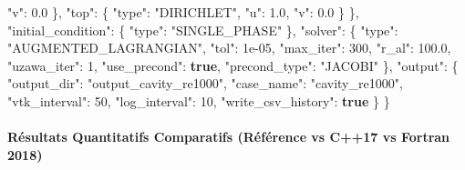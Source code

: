 \documentclass[
  10pt,
]{article}
\newenvironment{Shaded}{}{}
\newcommand{\DataTypeTok}[1]{\textcolor[rgb]{0.56,0.13,0.00}{#1}}
\newcommand{\DecValTok}[1]{\textcolor[rgb]{0.25,0.63,0.44}{#1}}
\newcommand{\FloatTok}[1]{\textcolor[rgb]{0.25,0.63,0.44}{#1}}
\newcommand{\FunctionTok}[1]{\textcolor[rgb]{0.02,0.16,0.49}{#1}}
\newcommand{\KeywordTok}[1]{\textcolor[rgb]{0.00,0.44,0.13}{\textbf{#1}}}
\newcommand{\StringTok}[1]{\textcolor[rgb]{0.25,0.44,0.63}{#1}}
\begin{document}
\begin{Shaded}
\begin{Highlighting}[]
      \DataTypeTok{"v"}\FunctionTok{:} \FloatTok{0.0}
    \FunctionTok{\},}
    \DataTypeTok{"top"}\FunctionTok{:} \FunctionTok{\{}
      \DataTypeTok{"type"}\FunctionTok{:} \StringTok{"DIRICHLET"}\FunctionTok{,}
      \DataTypeTok{"u"}\FunctionTok{:} \FloatTok{1.0}\FunctionTok{,}
      \DataTypeTok{"v"}\FunctionTok{:} \FloatTok{0.0}
    \FunctionTok{\}}
  \FunctionTok{\},}
  \DataTypeTok{"initial\_condition"}\FunctionTok{:} \FunctionTok{\{}
    \DataTypeTok{"type"}\FunctionTok{:} \StringTok{"SINGLE\_PHASE"}
  \FunctionTok{\},}
  \DataTypeTok{"solver"}\FunctionTok{:} \FunctionTok{\{}
    \DataTypeTok{"type"}\FunctionTok{:} \StringTok{"AUGMENTED\_LAGRANGIAN"}\FunctionTok{,}
    \DataTypeTok{"tol"}\FunctionTok{:} \DecValTok{1e{-}05}\FunctionTok{,}
    \DataTypeTok{"max\_iter"}\FunctionTok{:} \DecValTok{300}\FunctionTok{,}
    \DataTypeTok{"r\_al"}\FunctionTok{:} \FloatTok{100.0}\FunctionTok{,}
    \DataTypeTok{"uzawa\_iter"}\FunctionTok{:} \DecValTok{1}\FunctionTok{,}
    \DataTypeTok{"use\_precond"}\FunctionTok{:} \KeywordTok{true}\FunctionTok{,}
    \DataTypeTok{"precond\_type"}\FunctionTok{:} \StringTok{"JACOBI"}
  \FunctionTok{\},}
  \DataTypeTok{"output"}\FunctionTok{:} \FunctionTok{\{}
    \DataTypeTok{"output\_dir"}\FunctionTok{:} \StringTok{"output\_cavity\_re1000"}\FunctionTok{,}
    \DataTypeTok{"case\_name"}\FunctionTok{:} \StringTok{"cavity\_re1000"}\FunctionTok{,}
    \DataTypeTok{"vtk\_interval"}\FunctionTok{:} \DecValTok{50}\FunctionTok{,}
    \DataTypeTok{"log\_interval"}\FunctionTok{:} \DecValTok{10}\FunctionTok{,}
    \DataTypeTok{"write\_csv\_history"}\FunctionTok{:} \KeywordTok{true}
  \FunctionTok{\}}
\FunctionTok{\}}
\end{Highlighting}
\end{Shaded}

\paragraph{Résultats Quantitatifs Comparatifs (Référence vs C++17 vs
Fortran
2018)}\label{ruxe9sultats-quantitatifs-comparatifs-ruxe9fuxe9rence-vs-c17-vs-fortran-2018-7}
\end{document}
